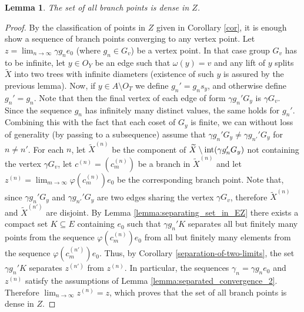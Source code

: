 \documentclass[12pt, a4paper]{article}
\newcommand{\8}{\infty}
\theoremstyle{break}
\newtheorem{lm}[thm]{Lemma}
\theoremstyle{defbreak}
\newcommand{\wtl}[1]{\widetilde{#1}}
\begin{document}
\medskip



\begin{lm}\label{lemma:branch_points_dense}
    The set of all branch points is dense in $Z$.
\end{lm}

\begin{proof}
    By the classification of points in $Z$ given in Corollary \ref{cor}, it is enough show a sequence of branch points converging to any vertex point. Let $z = \lim_{n\to \infty}\gamma g_ne_0$ (where $g_n\in G_v$) be a vertex point. In that case group $G_v$ has to be infinite, let $y\in O_Y$ be an edge such that $\omega(y)=v$ and any lift of $y$ splits $\wtl{X}$ into two trees with infinite diameters (existence of such $y$ is assured by the previous lemma). Now, if $y\in A\setminus O_T$ we define $g_n' = g_ns_y$, and otherwise define $g_n' = g_n$. Note that then the final vertex of each edge of form $\gamma g_n'G_y$ is $\gamma G_v$. Since the sequence $g_n$ has infinitely many distinct values, the same holds for $g_n'$. Combining this with the fact that each coset of $G_y$ is finite, we can without loss of generality (by passing to a subsequence) assume that $\gamma g_n' G_y\neq \gamma g_{n'}'G_y$ for $n\neq n'$. For each $n$, let $\wtl{X}^{(n)}$ be the component of $\wtl{X}\setminus\hbox{int}(\gamma g_n'G_y)$ not containing the vertex $\gamma G_v$, let $c^{(n)}=(c_m^{(n)})$ be a branch in $\wtl{X}^{(n)}$ and let $z^{(n)} = \lim_{m\to \8}\varphi(c^{(n)}_m)e_0$ be the corresponding branch point. Note that, since $\gamma g_n'G_y$ and $\gamma g_{n'}'G_y$ are two edges sharing the vertex $\gamma G_v$, therefore $\wtl{X}^{(n)}$ and $\wtl{X}^{(n')}$ are disjoint. By Lemma \ref{lemma:separating_set_in_EZ} there exists a compact set $K\subseteq E$ containing $e_0$ such that $\gamma g_n' K$ separates all but finitely many points from the sequence $\varphi(c^{(n)}_m)e_0$ from all but finitely many elements from the sequence $\varphi(c^{(n')}_m)e_0$. 
    Thus, by Corollary \ref{separation-of-two-limits}, the set $\gamma g_n' K$ separates $z^{(n')}$ from $z^{(n)}$. In particular, the sequences $\gamma_n = \gamma g_n e_0$ and $z^{(n)}$ satisfy the assumptions of Lemma \ref{lemma:separated_convergence_2}. Therefore $\lim_{n\to\8}z^{(n)} = z$, which proves that the set of all branch points is dense in $Z$.
\end{proof}
\end{document}
